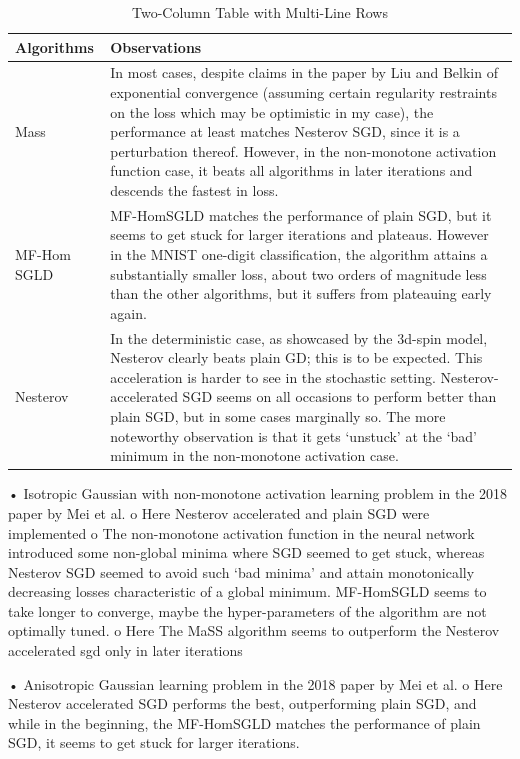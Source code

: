 \documentclass{article}
\begin{document}
\begin{table}[H]
\centering
\begin{tabular}{|p{7cm}|p{7cm}|} %
\hline
\textbf{Algorithms} & \textbf{Observations} \\
\hline\hline
Mass & In most cases, despite claims in the paper by Liu and Belkin \cite{liu2019acceleratingsgdmomentumoverparameterized} of exponential convergence (assuming certain regularity restraints on the loss which may be optimistic in my case), the performance at least matches Nesterov SGD, since it is a perturbation thereof. However, in the non-monotone activation function case, it beats all algorithms in later iterations and descends the fastest in loss.
\\
\hline
MF-Hom SGLD &MF-HomSGLD matches the performance of plain SGD, but it seems to get stuck for larger iterations and plateaus. However in the MNIST one-digit classification, the algorithm attains a substantially smaller loss, about two orders of magnitude less than the other algorithms, but it suffers from plateauing early again.
 \\
\hline
Nesterov & 	In the deterministic case, as showcased by the 3d-spin model, Nesterov clearly beats plain GD;  this is to be expected.
	This acceleration is harder to see in the stochastic setting. Nesterov-accelerated SGD seems on all occasions to perform better than plain SGD, but in some cases marginally so.
	The more noteworthy observation is that it gets ‘unstuck’ at the ‘bad’ minimum in the non-monotone activation case.
 \\
\hline
\end{tabular}
\caption{Two-Column Table with Multi-Line Rows}
\end{table}



•	Isotropic Gaussian with non-monotone activation learning problem in the 2018 paper by Mei et al.
o	Here Nesterov accelerated and plain SGD were implemented
o	The non-monotone activation function in the neural network introduced some non-global minima where SGD seemed to get stuck, whereas Nesterov SGD seemed to avoid such ‘bad minima’ and attain monotonically decreasing losses characteristic of a global minimum. MF-HomSGLD seems to take longer to converge, maybe the hyper-parameters of the algorithm are not optimally tuned.
o	Here The MaSS algorithm seems to outperform the Nesterov accelerated sgd only in later iterations
 

 
•	Anisotropic Gaussian learning problem in the 2018 paper by Mei et al.
o	Here Nesterov accelerated SGD performs the best, outperforming plain SGD, and while in the beginning, the MF-HomSGLD matches the performance of plain SGD, it seems to get stuck for larger iterations. 
\end{document}
